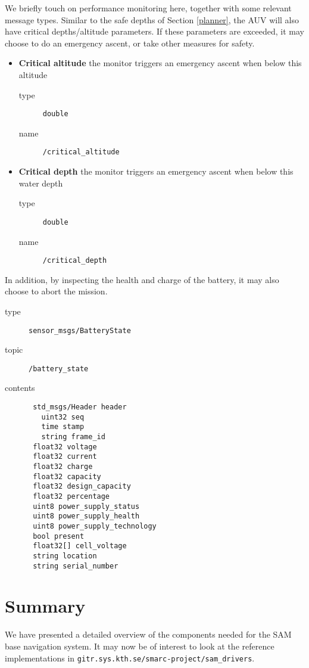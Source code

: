 \documentclass[9pt,technote]{IEEEtran} %
\begin{document}
We briefly touch on performance monitoring here, together with some
relevant message types. Similar to the safe depths of Section \ref{planner},
the AUV will also have critical depths/altitude parameters.
If these parameters are exceeded, it may choose to do an emergency ascent,
or take other measures for safety.
\begin{itemize}
\item \textbf{Critical altitude} the monitor triggers an emergency ascent when below this altitude \begin{description}
\item[type] \texttt{double}
\item[name] \texttt{/critical\_altitude}
\end{description}
\item \textbf{Critical depth} the monitor triggers an emergency ascent when below this water depth \begin{description}
\item[type] \texttt{double}
\item[name] \texttt{/critical\_depth}
\end{description}  
\end{itemize}
In addition, by inspecting the health and charge of the battery,
it may also choose to abort the mission.
\begin{description}
\item[type] \texttt{sensor\_msgs/BatteryState}
\item[topic] \texttt{/battery\_state}
\item[contents] \begin{scriptsize}
\begin{verbatim}
 std_msgs/Header header
   uint32 seq
   time stamp
   string frame_id
 float32 voltage
 float32 current
 float32 charge
 float32 capacity
 float32 design_capacity
 float32 percentage
 uint8 power_supply_status
 uint8 power_supply_health
 uint8 power_supply_technology
 bool present
 float32[] cell_voltage
 string location
 string serial_number
\end{verbatim}
\end{scriptsize}
\end{description}

\section{Summary}

We have presented a detailed overview of the components
needed for the SAM base navigation system. It may now
be of interest to look at the reference implementations in
\texttt{gitr.sys.kth.se/smarc-project/sam\_drivers}.

%
%
\end{document}
